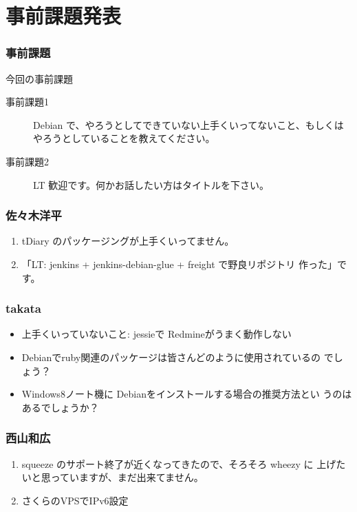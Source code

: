 \documentclass[cjk,dvipdfmx,10pt,compress,%
hyperref={bookmarks=true,bookmarksnumbered=true,bookmarksopen=false,%
colorlinks=false,%
pdftitle={第 80 回 関西 Debian 勉強会},%
pdfauthor={倉敷・のがた・佐々木・かわだ・八津尾},%
pdfsubject={資料},%
}]{beamer}
\begin{document}

\section{事前課題発表}


\begin{frame}[fragile]
  \frametitle{事前課題}
  \begin{block}{今回の事前課題}
    \begin{description}
    \item[事前課題1]
      Debian で、やろうとしてできていない上手くいってないこと、もしくは
      やろうとしていることを教えてください。
    \item[事前課題2]
      LT 歓迎です。何かお話したい方はタイトルを下さい。
    \end{description}
  \end{block}
\end{frame}


\begin{frame}
  \frametitle{ 佐々木洋平 }
  \begin{enumerate}
  \item tDiary のパッケージングが上手くいってません。
  \item 「LT: jenkins + jenkins-debian-glue + freight で野良リポジトリ
    作った」です。
  \end{enumerate}
\end{frame}

\begin{frame}
  \frametitle{ takata }
  \begin{itemize}
  \item 上手くいっていないこと: jessieで Redmineがうまく動作しない
  \item Debianでruby関連のパッケージは皆さんどのように使用されているの
    でしょう？ 
  \item Windows8ノート機に Debianをインストールする場合の推奨方法とい
    うのはあるでしょうか？
  \end{itemize}
\end{frame}

\begin{frame}
  \frametitle{ 西山和広 }
  \begin{enumerate}
  \item squeeze のサポート終了が近くなってきたので、そろそろ wheezy に
    上げたいと思っていますが、まだ出来てません。
  \item さくらのVPSでIPv6設定
  \end{enumerate}
\end{frame}
\end{document}
